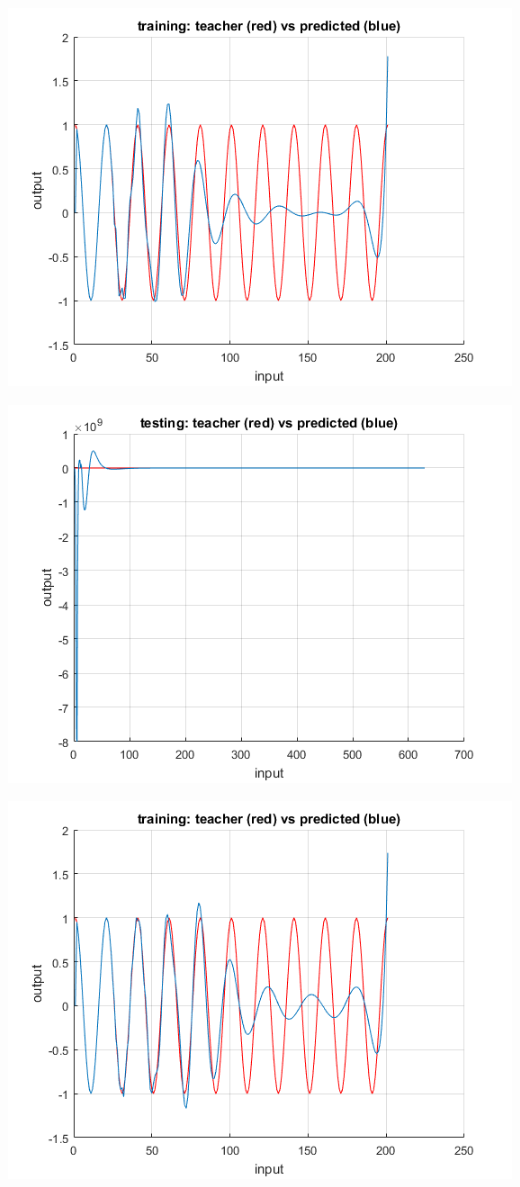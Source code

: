 \documentclass[a4paper, 12pt]{article}
\begin{document}
\begin{center}
\includegraphics[scale=0.6]{100plain.png}

\includegraphics[scale=0.6]{100plaint.png}


\includegraphics[scale=0.6]{100leaky.png}


\end{center}
\end{document}
